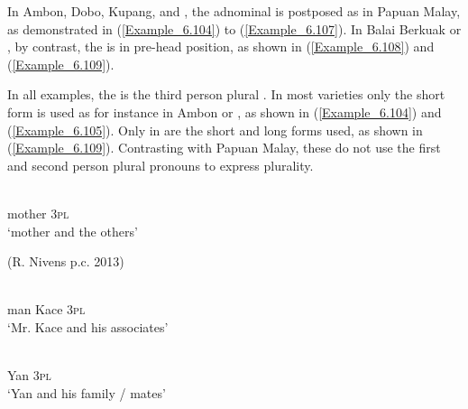 In Ambon, Dobo, Kupang, and , the adnominal  is postposed as in Papuan Malay, as demonstrated in (\ref{Example_6.104}) to (\ref{Example_6.107}). In Balai Berkuak or , by contrast, the  is in pre-head position, as shown in (\ref{Example_6.108}) and (\ref{Example_6.109}).



In all examples, the  is the third person plural . In most varieties only the short  form is used as for instance in Ambon or , as shown in (\ref{Example_6.104}) and (\ref{Example_6.105}). Only in  are the short and long forms used, as shown in (\ref{Example_6.109}). Contrasting with Papuan Malay, these  do not use the first and second person plural pronouns to express  plurality.

\begin{styleExampleTitle}
 \citep[169]{vanMinde.1997}
\end{styleExampleTitle}


\ea

\label{Example_6.104}
 {}\\ %
 mother  \textsc{3pl}    \\
 \glt ‘mother and the others’\\
\z

 
\begin{styleExampleTitle}
 (R. Nivens p.c. 2013)
\end{styleExampleTitle}


\ea

\label{Example_6.105}
 {} {}\\ %
 man  Kace  \textsc{3pl}  \\
 \glt ‘Mr. Kace and his associates’\\
\z

 
\begin{styleExampleTitle}
 \citep{Grimes.2008}
\end{styleExampleTitle}


\ea

\label{Example_6.106}
\gll
{}  \\
 Yan  \textsc{3pl}    \\
 \glt ‘Yan and his family / mates’\\
\z

